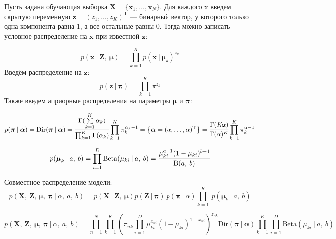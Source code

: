 \documentclass[twoside]{article}
\begin{document}
Пусть задана обучающая выборка $\textbf{X} = \{\textbf{x}_1, \dots , \textbf{x}_N \}.$ Для каждого x введем скрытую переменную $\textbf{z} =
(z_1,\dots, z_K)^\text{T}$ — бинарный вектор, у которого только одна компонента равна 1, а все остальные равны 0. Тогда
можно записать условное распределение на $\textbf{x}$ при известной $\textbf{z}$:

\begin{equation*}\label{eq_2}
p(\textbf{x} \:|\: {\textbf{Z}},\: \boldsymbol{\mu}) = \prod_{k = 1}^K p({\textbf{x}} \:|\: \boldsymbol{\mu}_k)^{z_k} 
\end{equation*}
Введём распределение на ${\textbf{z}}$:
\begin{equation*}\label{eq_3}
p(\textbf{z} \:|\: \boldsymbol{\pi}) = \prod_{k = 1}^K {\pi}^{{z}_k}
\end{equation*}
Также введем априорные распределения на параметры $\boldsymbol{\mu}$ и $ \boldsymbol{\pi}$:


\begin{equation*}\label{eq:1}
p(\boldsymbol\pi \:|\: \boldsymbol\alpha) = \mathrm{Dir}(\boldsymbol{\pi} \:|\: \boldsymbol{\alpha}) = \cfrac{\Gamma(\sum\limits_{k = 1}^K \alpha_k)}{\prod_{k = 1}^K \Gamma(\alpha_k)} \prod\limits_{k = 1}^K {\pi}_k^{\alpha_k - 1}
= \left\{ \boldsymbol\alpha = (\alpha,\dots,\alpha)^\text{T}\right\} =
\cfrac{\Gamma(\textit{K}\alpha)}{\Gamma(\alpha)^{K}} \prod_{k = 1}^K {\pi}_k^{\alpha - 1}
\end{equation*}

\begin{equation*}\label{eq:2}
p(\boldsymbol{\mu}_k \:|\: a,\: b) = \prod_{i = 1}^D \mathrm{Beta}(\mu_{ki} \:|\: a,\: b) = \cfrac{\mu_{ki}^{a - 1} (1 - \mu_{ki})^{b - 1}}{\mathrm{B}(a,\: b)}
\end{equation*}

Совместное распределение модели:
\begin{equation*}\label{eq:3}
p(\textbf{X},\: \textbf{Z},\: \boldsymbol{\mu},\: \boldsymbol{\pi}\: |\: {\alpha},\: a,\: b) = 
p(\textbf{X} \:|\: \textbf{Z},\: \boldsymbol\mu)  p(\textbf{Z} \:|\: \boldsymbol{\pi}) \:p(\boldsymbol\pi \:|\: {\alpha})  \prod_{k = 1}^K \:p(\boldsymbol\mu_k \:| \: a,\: b)
\end{equation*}	

\begin{equation}\label{eq:sr}
p(\textbf{X},\: \textbf{Z},\: \boldsymbol{\mu},\: \boldsymbol{\pi}\: |\: {\alpha},\: a,\: b) = 
\prod_{n = 1}^N \prod_{k = 1}^K \left(\pi_{nk} \prod_{i = 1}^D \mu_{ki}^{x_{ni}} (1-\mu_{ki})^{1 - x_{ni}}\right)^{z_{nk}}
\mathrm{Dir}(\boldsymbol{\pi} \:|\: \boldsymbol{\alpha})
\prod_{k = 1}^K \prod_{i = 1}^D \mathrm{Beta}(\mu_{ki} \:|\: a,\: b) 
\end{equation}	
\end{document}
